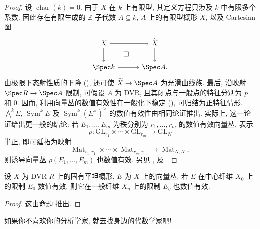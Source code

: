 \begin{proof}
设 $\operatorname{char}(k)=0$. 由于 $X$ 在 $k$ 上有限型, 其定义方程只涉及 $k$ 中有限多个系数. 因此存在有限生成的 $\mathbb Z$-子代数 $A\subseteq k$, $A$ 上的有限型概形 $\widetilde X$, 以及 Cartesian 图
\[
\begin{tikzcd}[column sep=3em,row sep=2em]
X\arrow[r]\arrow[d]\arrow[dr,phantom,"\square" description]&\widetilde X\arrow[d]\\
\Spec k\arrow[r]&\Spec A.
\end{tikzcd}
\]
由极限下态射性质的下降 (), 还可使 $\widetilde X\to\Spec A$ 为光滑曲线族. 最后, 沿映射 $\Spec R\to\Spec A$ 限制, 可假设 $A$ 为 DVR, 且其闭点与一般点的特征分别为 $p$ 和 $0$. 因而, 利用向量丛的数值有效性在一般化下稳定 (), 可归结为正特征情形. $\bigwedge^kE$, $\operatorname{Sym}^kE$ 及 $\operatorname{Sym}^k(E^\vee)^\vee$ 的数值有效性由相同论证推出. 实际上, 这一论证给出更一般的结论: 若 $E_1,\ldots,E_m$ 为秩分别为 $r_1,\ldots,r_m$ 的数值有效向量丛, 表示
\[
\rho:\mathrm{GL}_{r_1}\times\cdots\times\mathrm{GL}_{r_m}\longrightarrow\mathrm{GL}_N
\]
半正, 即可延拓为映射
\[
\operatorname{Mat}_{r_1,r_1}\times\cdots\times\operatorname{Mat}_{r_m,r_m}
\longrightarrow\operatorname{Mat}_{N,N},
\]
则诱导向量丛 $\rho(E_1,\ldots,E_m)$ 也数值有效. 另见 \cite[命题 $3.5$]{Kol90}, \cite[定理 $3.3$]{Bar71} 及 \cite[定理 $5.2$]{Har66a}.
\end{proof}
\begin{proposition}[向量丛的数值有效性在一般化下稳定]\label{src:B.2.34}
设 $X$ 为 DVR $R$ 上的固有平坦概形, $E$ 为 $X$ 上的向量丛. 若 $E$ 在中心纤维 $X_0$ 上的限制 $E_0$ 数值有效, 则它在一般纤维 $X_\eta$ 上的限制 $E_\eta$ 也数值有效.
\end{proposition}
\begin{proof}
这由命题  推出.
\end{proof}
\begin{epigraph}
如果你不喜欢你的分析学家, 就去找身边的代数学家吧!
\end{epigraph}
\par\clearpage
\endgroup
